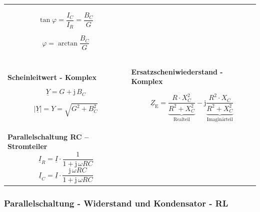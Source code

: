 \documentclass[a4paper,12pt]{article}
\begin{document}
\begin{tabular}{p{} p{}}
		$$\tan\varphi = \frac{I_C}{I_R} = \frac{B_C}{G}$$
		
		$$\varphi = \arctan\frac{B_C}{G}$$
		\\
		
		\vspace{5pt}
		\textbf{Scheinleitwert - Komplex}
		
		$$\underline{Y} = G + \mathrm{j}\,B_C$$
		
		$$|\underline{Y}| = Y = \sqrt{G^2 + B_C^2}$$
		
		&
		
		\vspace{5pt}
		\textbf{Ersatzscheniwiederstand - Komplex}
		
		\vspace{0pt}
		$$\underline{Z}_{\mathrm{E}} = \underbrace{\frac{R \cdot X_C^2}{R^2 + X_C^2}}_{\text{Realteil}} - \mathrm{j}\underbrace{\frac{R^2 \cdot X_C}{R^2 + X_C^2}}_{\text{Imaginärteil}}$$
		\\
		
		\textbf{Parallelschaltung RC -- Stromteiler}
		$$\underline{I}_R = \underline{I} \cdot \frac{1}{1 + \mathrm{j}\,\omega RC}$$
		$$\underline{I}_C = \underline{I} \cdot \frac{\mathrm{j}\,\omega RC}{1 + \mathrm{j}\,\omega RC}$$
		
	\end{tabular}
	
	\subsubsection{Parallelschaltung - Widerstand und Kondensator - RL}
	
\end{document}
